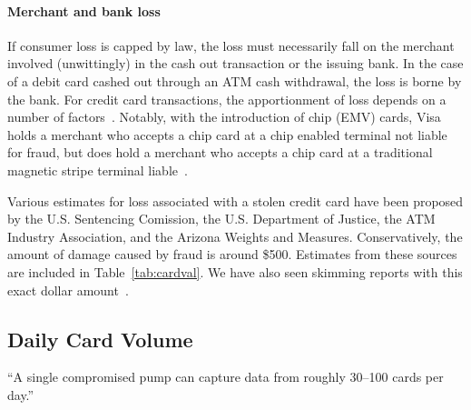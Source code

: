 \paragraph{Merchant and bank loss}
If consumer loss is capped by law, the loss must necessarily fall on the merchant involved (unwittingly) in the
cash out transaction or the issuing bank. In the case of a debit card cashed out through an ATM cash withdrawal, the
loss is borne by the bank. For credit card transactions, the apportionment of loss depends on a number of
factors~\cite{card-acceptance-guidelines-for-merchants}. Notably, with the introduction of chip (EMV) cards, Visa holds
a merchant who accepts a chip card at a chip enabled terminal not liable for fraud, but does hold a merchant who
accepts a chip card at a traditional magnetic stripe terminal liable~\cite{visa-liability-shift}.

Various estimates for loss associated with a stolen credit card have been proposed by the U.S. Sentencing Comission,
the U.S. Department of Justice, the ATM Industry Association, and the Arizona Weights and Measures. Conservatively, the
amount of damage caused by fraud is around \$500. Estimates from these sources are included in Table~\ref{tab:cardval}.
We have also seen skimming reports with this exact dollar amount~\cite{AZfiveHundred}.


\subsection{Daily Card Volume}
\label{sec:cardvol}



``A single compromised pump can capture data from roughly 30--100 cards per day.''~\cite{rippleshot}


